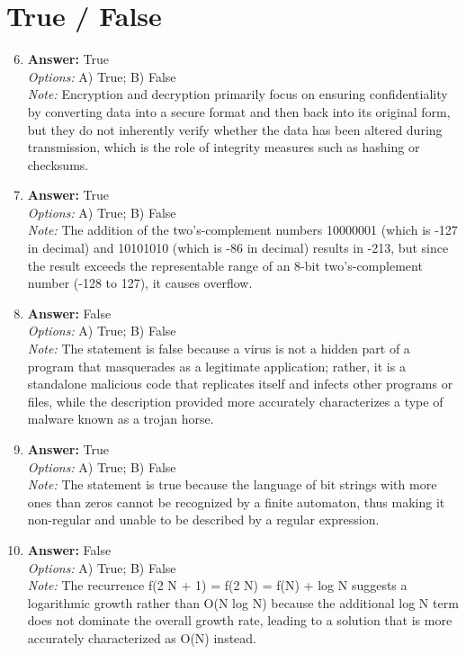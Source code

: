\documentclass[12pt]{article}
\begin{document}
\section*{True / False}
\begin{enumerate}[label=\arabic*.]
\setcounter{enumi}{5}
\item \textbf{Answer:} True
\\ \textit{Options:} A) True; B) False
\\ \textit{Note:} Encryption and decryption primarily focus on ensuring confidentiality by converting data into a secure format and then back into its original form, but they do not inherently verify whether the data has been altered during transmission, which is the role of integrity measures such as hashing or checksums.
\item \textbf{Answer:} True
\\ \textit{Options:} A) True; B) False
\\ \textit{Note:} The addition of the two's-complement numbers 10000001 (which is -127 in decimal) and 10101010 (which is -86 in decimal) results in -213, but since the result exceeds the representable range of an 8-bit two's-complement number (-128 to 127), it causes overflow.
\item \textbf{Answer:} False
\\ \textit{Options:} A) True; B) False
\\ \textit{Note:} The statement is false because a virus is not a hidden part of a program that masquerades as a legitimate application; rather, it is a standalone malicious code that replicates itself and infects other programs or files, while the description provided more accurately characterizes a type of malware known as a trojan horse.
\item \textbf{Answer:} True
\\ \textit{Options:} A) True; B) False
\\ \textit{Note:} The statement is true because the language of bit strings with more ones than zeros cannot be recognized by a finite automaton, thus making it non-regular and unable to be described by a regular expression.
\item \textbf{Answer:} False
\\ \textit{Options:} A) True; B) False
\\ \textit{Note:} The recurrence f(2 N + 1) = f(2 N) = f(N) + log N suggests a logarithmic growth rather than O(N log N) because the additional log N term does not dominate the overall growth rate, leading to a solution that is more accurately characterized as O(N) instead.
\end{enumerate}
\end{document}
